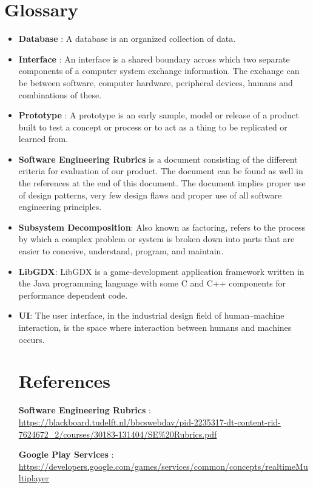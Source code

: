 \documentclass{article}
\begin{document}
	\section{Glossary}

	\begin{itemize}
		\item \textbf{Database} : A database is an organized collection of data.
		\item \textbf{Interface} : An interface is a shared boundary across which two separate components of a computer system exchange information. The exchange can be between software, computer hardware, peripheral devices, humans and combinations of these. 
		\item \textbf{Prototype} : A prototype is an early sample, model or release of a product built to test a concept or process or to act as a thing to be replicated or learned from.
		\item \textbf{Software Engineering Rubrics} is a document consisting of the different criteria for evaluation of our product. The document can be found as well in the references at the end of this document.  The document implies proper use of design patterns, very few design flaws and proper use of all software engineering principles.
		\item \textbf{Subsystem Decomposition}: Also known as factoring, refers to the process by which a complex problem or system is broken down into parts that are easier to conceive, understand, program, and maintain.
		\item \textbf{LibGDX}: LibGDX is a game-development application framework written in the Java programming language with some C and C++ components for performance dependent code.
		\item \textbf{UI}: The user interface, in the industrial design field of human–machine interaction, is the space where interaction between humans and machines occurs.

		\section{References}
		
			\textbf{Software Engineering Rubrics} : \url{https://blackboard.tudelft.nl/bbcswebdav/pid-2235317-dt-content-rid-7624672_2/courses/30183-131404/SE\%20Rubrics.pdf}

			\textbf{Google Play Services} : \url{https://developers.google.com/games/services/common/concepts/realtimeMultiplayer}
 
		
	\end{itemize}


	
\end{document}
